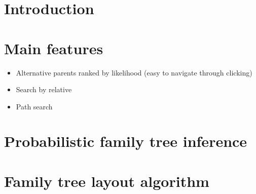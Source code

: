 \documentclass[sigconf]{acmart}
\begin{document}




\maketitle

\section{Introduction}

\section{Main features}

\begin{itemize}
 \item Alternative parents ranked by likelihood (easy to navigate through clicking)
 \item Search by relative
 \item Path search
\end{itemize}

\section{Probabilistic family tree inference}

\section{Family tree layout algorithm}


 
\end{document}
